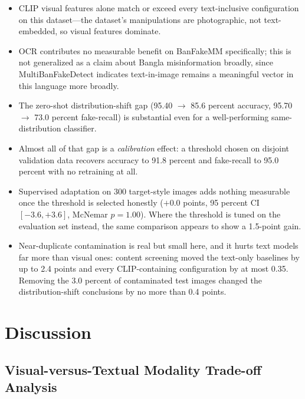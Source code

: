 \documentclass[conference,a4paper]{IEEEtran}
\begin{document}
\begin{itemize}
\item CLIP visual features alone match or exceed every text-inclusive
configuration on this dataset---the dataset's manipulations are photographic,
not text-embedded, so visual features dominate.

\item OCR contributes no measurable benefit on BanFakeMM specifically; this is
not generalized as a claim about Bangla misinformation broadly, since
MultiBanFakeDetect \cite{multibanfake} indicates text-in-image remains a
meaningful vector in this language more broadly.

\item The zero-shot distribution-shift gap (95.40 $\rightarrow$ 85.6 percent
accuracy, 95.70 $\rightarrow$ 73.0 percent fake-recall) is substantial even
for a well-performing same-distribution classifier.

\item Almost all of that gap is a \emph{calibration} effect: a threshold
chosen on disjoint validation data recovers accuracy to 91.8 percent and
fake-recall to 95.0 percent with no retraining at all.

\item Supervised adaptation on 300 target-style images adds nothing measurable
once the threshold is selected honestly ($+0.0$ points, 95 percent CI
$[-3.6, +3.6]$, McNemar $p = 1.00$). Where the threshold is tuned on the
evaluation set instead, the same comparison appears to show a 1.5-point gain.

\item Near-duplicate contamination is real but small here, and it hurts text
models far more than visual ones: content screening moved the text-only
baselines by up to 2.4 points and every CLIP-containing configuration by at
most 0.35. Removing the 3.0 percent of contaminated test images changed the
distribution-shift conclusions by no more than 0.4 points.
\end{itemize}

\section{Discussion}

\subsection{Visual-versus-Textual Modality Trade-off Analysis}
\end{document}
